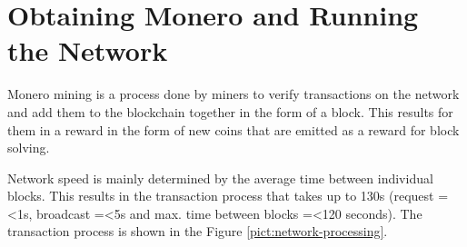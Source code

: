 \documentclass[
  printed, %
  table,   %
  lof,     %
  lot,     %
           oneside, color
]{fithesis3}
\begin{document}
\chapter{Obtaining Monero and Running the Network}
\label{cha:obtaining}
Monero mining is a process done by miners to verify transactions on the network and add them to the blockchain together in the form of a block. This results for them in a reward in the form of new coins that are emitted as a reward for block solving.

Network speed is mainly determined by the average time between individual blocks. %
This results in the transaction process that takes up to 130s (request =\textless 1s, broadcast =\textless 5s and max. time between blocks =\textless 120 seconds).  The transaction process is shown in the Figure \ref{pict:network-processing}.
\end{document}
